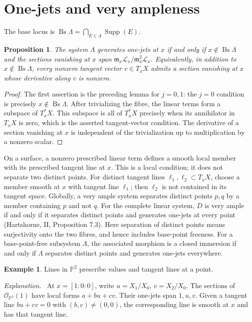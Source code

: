 \documentclass[12pt,a4paper,psamsfonts]{amsart}
\newtheorem{proposition}[lemma]{Proposition}
\theoremstyle{definition}
\newtheorem{example}[lemma]{Example}
\newenvironment{explanation}{\par\noindent\emph{Explanation.}\ }{\par}
\newcommand{\OO}{\mathcal O}
\begin{document}
\section{One-jets and very ampleness}
The base locus is $\operatorname{Bs}\Lambda=
\bigcap_{E\in\Lambda}\operatorname{Supp}(E)$.
\begin{proposition}
The system $\Lambda$ generates one-jets at $x$ if and only if  $x\notin\operatorname{Bs}\Lambda$ and the sections vanishing at $x$ span
$\mathfrak m_x\mathcal L_x/\mathfrak m_x^2\mathcal L_x$.
Equivalently, in addition to $x\notin\operatorname{Bs}\Lambda$, every nonzero tangent
vector $v\in T_xX$ admits a section vanishing at $x$ whose derivative
along $v$ is nonzero.
\end{proposition}
\begin{proof}
The first assertion is the preceding lemma for $j=0,1$: the $j=0$
condition is precisely $x\notin\operatorname{Bs}\Lambda$.
After trivializing the fibre, the linear terms form a subspace of
$T_x^*X$. This subspace is all of $T_x^*X$ precisely when its annihilator
in $T_xX$ is zero, which is the asserted tangent-vector condition.
The derivative of a section vanishing at $x$ is independent of the
trivialization up to multiplication by a nonzero scalar.
\end{proof}
On a surface, a nonzero prescribed linear term defines a smooth local
member with its prescribed tangent line at $x$. This is a local condition;
it does not separate two distinct points. For distinct tangent lines
$\ell_1,\ell_2\subset T_xX$, choose a member smooth at $x$ with
tangent line $\ell_1$; then $\ell_2$ is not contained in its tangent space.
Globally, a very ample system separates distinct points $p,q$ by a
member containing $p$ and not $q$.
For the complete linear system, $D$ is very ample if and only if it
separates distinct points and generates one-jets at every point
(Hartshorne, II, Proposition 7.3). Here separation of distinct points
means surjectivity onto the two fibres, and hence includes base-point
freeness. For a base-point-free subsystem $\Lambda$, the associated morphism
is a closed immersion if and only if $\Lambda$ separates distinct
points and generates one-jets everywhere.

\begin{example}
Lines in $\mathbb P^2$ prescribe values and tangent lines at a point.
\end{example}
\begin{explanation}
At $x=[1:0:0]$, write $u=X_1/X_0$, $v=X_2/X_0$.
The sections of $\OO_{\mathbb P^2}(1)$ have local forms $a+bu+cv$.
Their one-jets span $1,u,v$. Given a tangent line $bu+cv=0$ with
$(b,c)\ne(0,0)$, the corresponding line is smooth at $x$ and has that
 tangent line.
\end{explanation}
\end{document}
